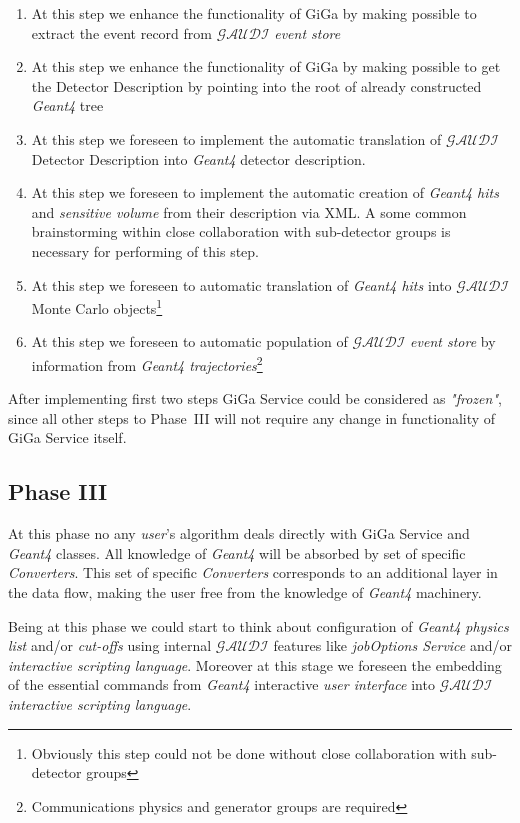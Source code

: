 \documentclass[nfss,times,12pt,a4paper]{article}
\begin{document}
{\begin{enumerate} 
\item 
At this step we enhance the functionality 
of {\sc GiGa} by making possible to extract the 
event record  from ${\mathcal{GAUDI}}$ {\it event store} 
\item 
At this step we enhance the functionality 
of {\sc GiGa} by making possible to get the 
Detector Description by pointing into the root of 
already constructed {\it Geant4} tree 
\item 
At this step we foreseen to implement the automatic
translation of ${\mathcal{GAUDI}}$ Detector 
Description into {\it Geant4} detector description.  
\item 
At this step we foreseen to implement the automatic
creation of {\it Geant4 hits} and {\it sensitive volume}
from their description via XML. A some common 
brainstorming within close collaboration with 
sub-detector groups is necessary for performing of 
this step.    
\item 
At this step we foreseen to automatic
translation of {\it Geant4 hits} into 
${\mathcal{GAUDI}}$ Monte Carlo objects\footnote{Obviously this step could not be done without close collaboration with sub-detector groups}
\item 
At this step we foreseen to automatic
population of ${\mathcal{GAUDI}}$ {\it event store} by information from 
 {\it Geant4 trajectories}\footnote{Communications physics and generator groups are required}
\end{enumerate} 
 
After implementing first two steps 
{\sc GiGa} Service could be considered as {\it "frozen"}, since all other 
steps to Phase~III will not require any change in functionality of {\sc GiGa} Service itself. 

\subsection{ Phase III } 

At this phase no any {\it user}'s algorithm
deals directly with {\sc GiGa } Service and  
{\it Geant4} classes. All knowledge of  
{\it Geant4} will be absorbed by set of specific 
{\it Converters}. This set of specific {\it Converters} 
corresponds to an additional layer in the data flow,  
making the user free from the knowledge
 of {\it Geant4} machinery.    

Being at this phase we could start to think about 
configuration of {\it Geant4} {\it physics list} 
and/or {\it cut-offs} using internal 
${\mathcal{GAUDI}}$ features like 
{\it jobOptions Service} and/or {\it interactive scripting language}. 
Moreover at this stage we foreseen the embedding of  
the essential commands from {\it Geant4} interactive 
{\it user interface} into 
${\mathcal{GAUDI}}$ {\it interactive scripting language}.     

}
\end{document}
